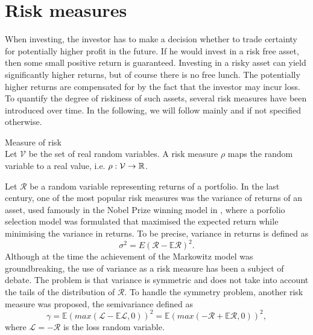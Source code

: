 \chapter{Risk measures}
When investing, the investor has to make a decision whether to trade certainty for potentially higher profit in the future. If he would invest in a risk free asset, then some small positive return is guaranteed. Investing in a risky asset can yield significantly higher returns, but of course there is no free lunch. The potentially higher returns are compensated for by the fact that the investor may incur loss. To quantify the degree of riskiness of such assets, several risk measures have been introduced over time.
In the following, we will follow mainly \cite{leoppold_risk_measures} and \cite[p. 275-278]{cornuejols_tutuncu_2006} if not specified otherwise.

\begin{defn}{Measure of risk} \\
Let $\mathcal{V}$ be the set of real random variables. A risk measure $\rho$ maps the random variable to a real value, i.e. $\rho: \mathcal{V} \rightarrow \mathbb{R}$.
\end{defn}

Let $\mathcal{R}$ be a random variable representing returns of a portfolio. In the last century, one of the most popular risk measures was the variance of returns of an asset, used famously in the Nobel Prize winning model in \cite{markowitz}, where a porfolio selection model was formulated that maximised the expected return while minimising the variance in returns. To be precise, variance in returns is defined as
\begin{equation*}
\sigma^2=E(\mathcal{R} - \mathbb{E}\mathcal{R} )^2.
\end{equation*}
Although at the time the achievement of the Markowitz model was groundbreaking, the use of variance as a risk measure has been a subject of debate. The problem is that variance is symmetric and does not take into account the tails of the distribution of $\mathcal{R}$. To handle the symmetry problem, another risk measure was proposed, the semivariance defined as
\begin{equation*}
\gamma=\mathbb{E}(max(\mathcal{L} - \mathbb{E}\mathcal{L},0))^2=\mathbb{E}(max(-\mathcal{R} + \mathbb{E}\mathcal{R},0))^2,
\end{equation*}
where $\mathcal{L}=-\mathcal{R}$ is the loss random variable.

